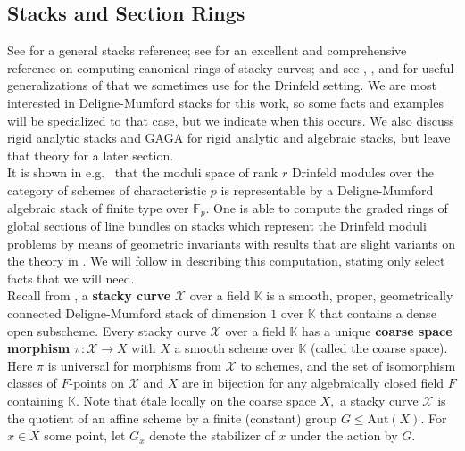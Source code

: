 \documentclass[11pt]{amsart}
\theoremstyle{definition}
\numberwithin{equation}{section}
\newcommand{\Aut}{\mathrm{Aut}} 	%
\newcommand{\sX}{\mathscr{X}}		%
\newcommand{\bbF}{\mathbb{F}}		%
\newcommand{\bbK}{\mathbb{K}}		%
\begin{document}
		\subsection{Stacks and Section Rings}
		
		See \cite{Alper-Stacks-and-Moduli} for a general stacks reference; see \cite{VZB} for an excellent and comprehensive reference on computing canonical rings of stacky curves; and see \cite{ODorney-canonical-rings-Q-divisors-on-P1}, \cite{Cerchia-Franklin-ODorney-Qdiv-Ell-curves}, and \cite{Landesman-Ruhm-Zhang-Spin-canonical-rings} for useful generalizations of \cite{VZB} that we sometimes use for the Drinfeld setting. We are most interested in Deligne-Mumford stacks for this work, so some facts and examples will be specialized to that case, but we indicate when this occurs. We also discuss rigid analytic stacks and GAGA for rigid analytic and algebraic stacks, but leave that theory for a later section. \\ 
		
		It is shown in e.g.\ \cite[Corollary $1.4.3$]{Laumon-cohomology-Drinfeld-modular-varieties} that the moduli space of rank $r$ Drinfeld modules over the category of schemes of characteristic $p$ is representable by a Deligne-Mumford algebraic stack of finite type over $\bbF_p.$ 
		One is able to compute the graded rings of global sections of line bundles on stacks which represent the Drinfeld moduli problems by means of geometric invariants with results that are slight variants on the theory in \cite{VZB}. We will follow \cite{VZB} in describing this computation, stating only select facts that we will need.\\
		
		Recall from \cite[Definition $5.2.1$]{VZB}, a \textbf{stacky curve} $\sX$ over a field $\bbK$ is a smooth, proper, geometrically connected Deligne-Mumford stack of dimension $1$ over $\bbK$ that contains a dense open subscheme. Every stacky curve $\sX$ over a field $\bbK$ has a unique \textbf{coarse space morphism} $\pi:\sX\to X$ with $X$ a smooth scheme over $\bbK$ (called the coarse space). Here $\pi$ is universal for morphisms from $\sX$ to schemes, and the set of isomorphism classes of $F$-points on $\sX$ and $X$ are in bijection for any algebraically closed field $F$ containing $\bbK.$ Note that \'etale locally on the coarse space $X,$ a stacky curve $\sX$ is the quotient of an affine scheme by a finite (constant) group $G\leq \Aut(X).$ For $x\in X$ some point, let $G_x$ denote the stabilizer of $x$ under the action by $G.$\\
		
\end{document}
